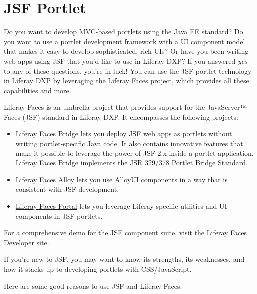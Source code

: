 \chapter{JSF Portlet}\label{jsf-portlet}

Do you want to develop MVC-based portlets using the Java EE standard? Do
you want to use a portlet development framework with a UI component
model that makes it easy to develop sophisticated, rich UIs? Or have you
been writing web apps using JSF that you'd like to use in Liferay DXP?
If you answered \emph{yes} to any of these questions, you're in luck!
You can use the JSF portlet technology in Liferay DXP by leveraging the
Liferay Faces project, which provides all these capabilities and more.

Liferay Faces is an umbrella project that provides support for the
JavaServer™ Faces (JSF) standard in Liferay DXP. It encompasses the
following projects:

\begin{itemize}
\tightlist
\item
  \href{/docs/7-2/reference/-/knowledge_base/r/understanding-liferay-faces-bridge}{Liferay
  Faces Bridge} lets you deploy JSF web apps as portlets without writing
  portlet-specific Java code. It also contains innovative features that
  make it possible to leverage the power of JSF 2.x inside a portlet
  application. Liferay Faces Bridge implements the JSR 329/378 Portlet
  Bridge Standard.
\item
  \href{/docs/7-2/reference/-/knowledge_base/r/understanding-liferay-faces-alloy}{Liferay
  Faces Alloy} lets you use AlloyUI components in a way that is
  consistent with JSF development.
\item
  \href{/docs/7-2/reference/-/knowledge_base/r/understanding-liferay-faces-portal}{Liferay
  Faces Portal} lets you leverage Liferay-specific utilities and UI
  components in JSF portlets.
\end{itemize}

For a comprehensive demo for the JSF component suite, visit the
\href{https://faces.liferay.dev}{Liferay Faces Developer site}.

If you're new to JSF, you may want to know its strengths, its
weaknesses, and how it stacks up to developing portlets with
CSS/JavaScript.

Here are some good reasons to use JSF and Liferay Faces:

